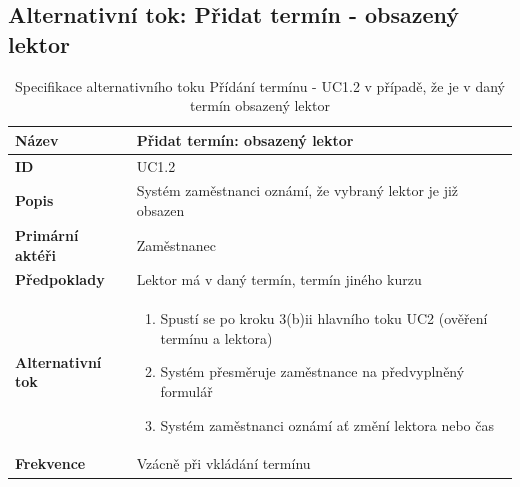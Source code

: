 \documentclass[12pt,a4paper,titlepage,final]{report}
\begin{document}
\subsection{Alternativní tok: Přidat termín - obsazený lektor}
\begin{table}[!h]	
	\begin{center}
    \begin{tabular}{ | p{4.5cm} | p{13cm} | }
    \hline
    \textbf{Název} & Přidat termín: obsazený lektor
    \\ \hline
    
	\textbf{ID} & UC1.2
	\\ \hline
	
	\textbf{Popis} & Systém zaměstnanci oznámí, že vybraný lektor je již obsazen
	\\ \hline
	    
	\textbf{Primární aktéři} & Zaměstnanec
	\\ \hline
	
	\textbf{Předpoklady} & Lektor má v daný termín, termín jiného kurzu
    \\ \hline
    
    \textbf{Alternativní tok} & 
	    \vspace{-3.5mm}
    	\begin{enumerate}
   	        \itemsep0em 
    		\item Spustí se po kroku 3(b)ii hlavního toku UC2 (ověření termínu a lektora)
	    	\item Systém přesměruje zaměstnance na předvyplněný formulář
	    	\item Systém zaměstnanci oznámí ať změní lektora nebo čas
    	\end{enumerate}
    \\ \hline 

	\textbf{Frekvence} & Vzácně při vkládání termínu
	\\ \hline
	\end{tabular}	
	\caption{Specifikace alternativního toku Přídání termínu - UC1.2 v případě, že je v daný termín obsazený lektor}	
	\end{center}
\end{table}

\newpage
\end{document}
